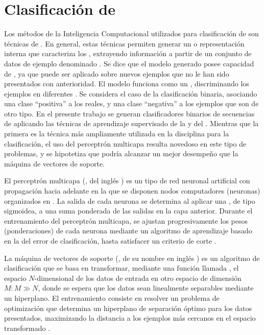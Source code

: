 %
%
%
\section{Clasificación de }
%
Los métodos de la Inteligencia Computacional utilizados para
clasificación de  son técnicas de .
En general, estas técnicas permiten generar un  o
representación interna que caracteriza los , extrayendo
información a partir de un conjunto de datos de ejemplo denominado
.
Se dice que el modelo generado posee capacidad de ,
ya que puede ser aplicado sobre nuevos ejemplos que no le han sido
presentados con anterioridad.
El modelo funciona como un , discriminando los
ejemplos en diferentes .
Se considera el caso de la clasificación binaria, asociando una clase
``positiva'' a los  reales, y una clase ``negativa'' a los
ejemplos que son de otro tipo.
En el presente trabajo se generan clasificadores binarios de
secuencias de  aplicando las técnicas de aprendizaje
supervisado de la  \cite{svm} y
del  \cite{mlp1,mlp2}.
Mientras que la primera es la técnica más ampliamente utilizada en
la disciplina para la clasificación, el uso del perceptrón multicapa
resulta novedoso en este tipo de problemas, y se hipotetiza que podría
alcanzar un mejor desempeño que la máquina de vectores de soporte.

El perceptrón multicapa (, del inglés ) es un tipo de red neuronal artificial con propagación
hacia adelante en la que se disponen nodos computadores (neuronas)
organizados en .
La salida de cada neurona se determina al aplicar una , de tipo sigmoidea, a una suma ponderada de las salidas
en la capa anterior.
Durante el entrenamiento del perceptrón multicapa, se ajustan
progresivamente los pesos (ponderaciones) de cada neurona mediante un
algoritmo de aprendizaje basado en la  del
error de clasificación, hasta satisfacer un criterio de corte
\cite{jain}.

La máquina de vectores de soporte (, de su nombre en inglés
) es un algoritmo de clasificación que se
basa en transformar, mediante una función llamada , el
espacio $N$-dimensional de los datos de entrada en otro espacio de
dimensión $M: M\gg N$, donde se espera que los datos sean linealmente
separables mediante un hiperplano.
El entrenamiento consiste en resolver un problema de optimización que
determina un hiperplano de separación óptimo para los datos
presentados, maximizando la distancia a los ejemplos más cercanos en
el espacio transformado \cite{bottou}.
